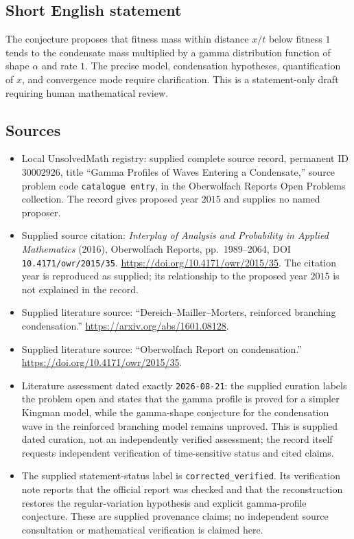 \documentclass[11pt]{article}
\begin{document}
\subsection{Short English statement}
The conjecture proposes that fitness mass within distance \(x/t\) below fitness \(1\) tends to the condensate mass multiplied by a gamma distribution function of shape \(\alpha\) and rate \(1\). The precise model, condensation hypotheses, quantification of \(x\), and convergence mode require clarification. This is a statement-only draft requiring human mathematical review.
\subsection{Sources}
\begin{itemize}
\item Local UnsolvedMath registry: supplied complete source record, permanent ID \(30002926\), title ``Gamma Profiles of Waves Entering a Condensate,'' source problem code \texttt{catalogue entry}, in the Oberwolfach Reports Open Problems collection. The record gives proposed year \(2015\) and supplies no named proposer.
\item Supplied source citation: \emph{Interplay of Analysis and Probability in Applied Mathematics} (2016), Oberwolfach Reports, pp.\ 1989--2064, DOI \texttt{10.4171/owr/2015/35}. \url{https://doi.org/10.4171/owr/2015/35}. The citation year is reproduced as supplied; its relationship to the proposed year \(2015\) is not explained in the record.
\item Supplied literature source: ``Dereich--Mailler--Morters, reinforced branching condensation.'' \url{https://arxiv.org/abs/1601.08128}.
\item Supplied literature source: ``Oberwolfach Report on condensation.'' \url{https://doi.org/10.4171/owr/2015/35}.
\item Literature assessment dated exactly \texttt{2026-08-21}: the supplied curation labels the problem open and states that the gamma profile is proved for a simpler Kingman model, while the gamma-shape conjecture for the condensation wave in the reinforced branching model remains unproved. This is supplied dated curation, not an independently verified assessment; the record itself requests independent verification of time-sensitive status and cited claims.
\item The supplied statement-status label is \texttt{corrected\_verified}. Its verification note reports that the official report was checked and that the reconstruction restores the regular-variation hypothesis and explicit gamma-profile conjecture. These are supplied provenance claims; no independent source consultation or mathematical verification is claimed here.
\end{itemize}
\end{document}
